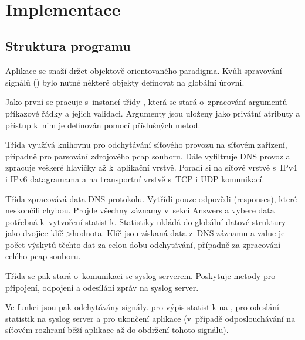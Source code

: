 \documentclass[11pt, a4paper, titlepage]{article}
\begin{document}
\begin{center}
	 \\
\end{center}

\newpage


\section{Implementace}

\subsection{Struktura programu}

Aplikace se snaží držet objektově orientovaného paradigma. Kvůli spravování signálů () bylo nutné některé objekty definovat na globální úrovni.
\bigskip

Jako první se pracuje s~instancí třídy , která se stará o~zpracování argumentů příkazové řádky a jejich validaci. Argumenty jsou uloženy jako privátní atributy a přístup k~nim je definován pomocí příslušných metod.
\bigskip

Třída  využívá  knihovnu pro odchytávání síťového provozu na síťovém zařízení, případně pro parsování zdrojového pcap souboru. Dále vyfiltruje DNS provoz a zpracuje veškeré hlavičky až k~aplikační vrstvě. Poradí si na síťové vrstvě s~IPv4 i IPv6 datagramama a na transportní vrstvě s~TCP i UDP komunikací.
\bigskip

Třída  zpracovává data DNS protokolu. Vytřídí pouze odpovědi (responses), které neskončili chybou. Projde všechny záznamy v~sekci Answers a vybere data potřebná k~vytvoření statistik. Statistiky ukládá do globální datové struktury  jako dvojice klíč->hodnota. Klíč jsou získaná data z~DNS záznamu a value je počet výskytů těchto dat za celou dobu odchytávání, případně za zpracování celého pcap souboru.
\bigskip

Třída  se pak stará o~komunikaci se syslog serverem. Poskytuje metody pro připojení, odpojení a odesílání zpráv na syslog server.
\bigskip

Ve funkci  jsou pak odchytávány signály.  pro výpis statistik na ,  pro odeslání statistik na syslog server a  pro ukončení aplikace (v~případě odposlouchávání na síťovém rozhraní běží aplikace až do obdržení tohoto signálu).
\bigskip
\end{document}
